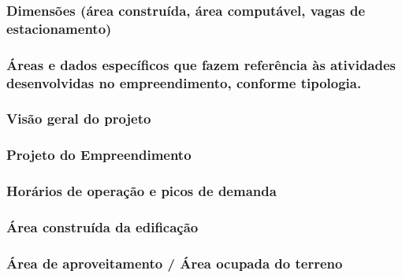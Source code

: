 \documentclass[]{article}
\begin{document}
\hypertarget{dimensuxf5es-uxe1rea-construuxedda-uxe1rea-computuxe1vel-vagas-de-estacionamento}{%
\subsubsection{Dimensões (área construída, área computável, vagas de
estacionamento)}\label{dimensuxf5es-uxe1rea-construuxedda-uxe1rea-computuxe1vel-vagas-de-estacionamento}}

\hypertarget{uxe1reas-e-dados-especuxedficos-que-fazem-referuxeancia-uxe0s-atividades-desenvolvidas-no-empreendimento-conforme-tipologia.}{%
\subsubsection{Áreas e dados específicos que fazem referência às
atividades desenvolvidas no empreendimento, conforme
tipologia.}\label{uxe1reas-e-dados-especuxedficos-que-fazem-referuxeancia-uxe0s-atividades-desenvolvidas-no-empreendimento-conforme-tipologia.}}

\hypertarget{visuxe3o-geral-do-projeto}{%
\subsubsection{Visão geral do projeto}\label{visuxe3o-geral-do-projeto}}

\hypertarget{projeto-do-empreendimento}{%
\subsubsection{Projeto do
Empreendimento}\label{projeto-do-empreendimento}}

\hypertarget{horuxe1rios-de-operauxe7uxe3o-e-picos-de-demanda}{%
\subsubsection{Horários de operação e picos de
demanda}\label{horuxe1rios-de-operauxe7uxe3o-e-picos-de-demanda}}

\hypertarget{uxe1rea-construuxedda-da-edificauxe7uxe3o}{%
\subsubsection{Área construída da
edificação}\label{uxe1rea-construuxedda-da-edificauxe7uxe3o}}

\hypertarget{uxe1rea-de-aproveitamento-uxe1rea-ocupada-do-terreno}{%
\subsubsection{Área de aproveitamento / Área ocupada do
terreno}\label{uxe1rea-de-aproveitamento-uxe1rea-ocupada-do-terreno}}
\end{document}
